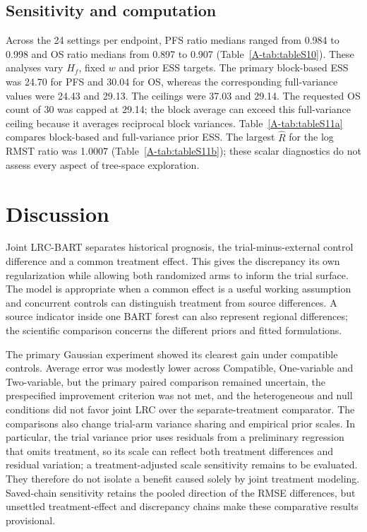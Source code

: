 \documentclass[11pt]{article}
\begin{document}
\subsection{Sensitivity and computation}
Across the 24 \lrc{} settings per endpoint, PFS ratio medians ranged from 0.984 to 0.998 and OS ratio medians from 0.897 to 0.907 (Table~\ref{A-tab:tableS10}). These analyses vary $H_f$, fixed $w$ and prior ESS targets. The primary block-based ESS was 24.70 for PFS and 30.04 for OS, whereas the corresponding full-variance values were 24.43 and 29.13. The ceilings were 37.03 and 29.14. The requested OS count of 30 was capped at 29.14; the block average can exceed this full-variance ceiling because it averages reciprocal block variances. Table~\ref{A-tab:tableS11a} compares block-based and full-variance prior ESS. The largest $\widehat R$ for the log RMST ratio was 1.0007 (Table~\ref{A-tab:tableS11b}); these scalar diagnostics do not assess every aspect of tree-space exploration.

\section{Discussion}
Joint LRC-BART separates historical prognosis, the trial-minus-external control difference and a common treatment effect. This gives the discrepancy its own regularization while allowing both randomized arms to inform the trial surface. The model is appropriate when a common effect is a useful working assumption and concurrent controls can distinguish treatment from source differences. A source indicator inside one BART forest can also represent regional differences; the scientific comparison concerns the different priors and fitted formulations.

The primary Gaussian experiment showed its clearest gain under compatible controls. Average error was modestly lower across Compatible, One-variable and Two-variable, but the primary paired comparison remained uncertain, the prespecified improvement criterion was not met, and the heterogeneous and null conditions did not favor joint LRC over the separate-treatment comparator. The comparisons also change trial-arm variance sharing and empirical prior scales. In particular, the trial variance prior uses residuals from a preliminary regression that omits treatment, so its scale can reflect both treatment differences and residual variation; a treatment-adjusted scale sensitivity remains to be evaluated. They therefore do not isolate a benefit caused solely by joint treatment modeling. Saved-chain sensitivity retains the pooled direction of the RMSE differences, but unsettled treatment-effect and discrepancy chains make these comparative results provisional.
\end{document}
